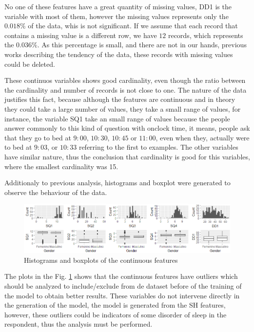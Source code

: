 \documentclass[]{book}
\begin{document}
No one of these features have a great quantity of missing values, DD1 is
the variable with most of them, however the missing values represents
only the \(0.018 \%\) of the data, whis is not significant. If we assume
that each record that contains a missing value is a different row, we
have \(12\) records, which represents the \(0.036\%\). As this
percentage is small, and there are not in our hands, previous works
describing the tendency of the data, these records with missing values
could be deleted.

These continuos variables shows good cardinality, even though the ratio
between the cardinality and number of records is not close to one. The
nature of the data justifies this fact, because although the features
are continuous and in theory they could take a large number of values,
they take a small range of values, for instance, the variable SQ1 take
an small range of values because the people answer commonly to this kind
of question with onclock time, it means, people ask that they go to bed
at \(9:00\), \(10:30\), \(10:45\) or \(11:00\), even when they, actually
were to bed at \(9:03\), or \(10:33\) referring to the first to
examples. The other variables have similar nature, thus the conclusion
that cardinality is good for this variables, where the smallest
cardinality was 15.

Additionaly to previous analysis, histograms and boxplot were generated
to observe the behaviour of the data.

\begin{figure}[H]

{\centering \includegraphics[width=0.9\linewidth]{images/hist-boxplots-continuous-variables} 

}

\caption{Histograms and boxplots of the continuous features}\label{fig:hb-of-cf}
\end{figure}

The plots in the Fig. \ref{fig:hb-of-cf} shows that the continuous
features have outliers which should be analyzed to include/exclude from
de dataset before of the training of the model to obtain better results.
These variables do not intervene directly in the generation of the
model, the model is generated from the SH features, however, these
outliers could be indicators of some disorder of sleep in the
respondent, thus the analysis must be performed.
\end{document}
